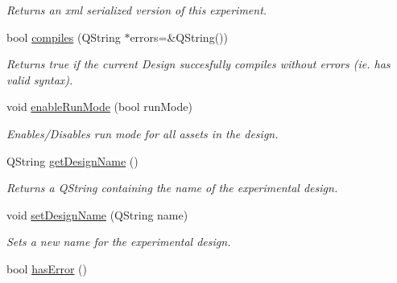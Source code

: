 \begin{DoxyCompactItemize}
\begin{DoxyCompactList}\small\item\em Returns an xml serialized version of this experiment. \end{DoxyCompactList}\item 
bool \hyperlink{class_picto_1_1_design_root_aa0fbfa60b431b196b01616f4107d101c}{compiles} (Q\-String $\ast$errors=\&Q\-String())
\begin{DoxyCompactList}\small\item\em Returns true if the current Design succesfully compiles without errors (ie. has valid syntax). \end{DoxyCompactList}\item 
void \hyperlink{class_picto_1_1_design_root_a602921939c89f471772431dae8c3281a}{enable\-Run\-Mode} (bool run\-Mode)
\begin{DoxyCompactList}\small\item\em Enables/\-Disables run mode for all assets in the design. \end{DoxyCompactList}\item 
\hypertarget{class_picto_1_1_design_root_a9265a1d94d1863fa5c68f02be5b9cb26}{Q\-String \hyperlink{class_picto_1_1_design_root_a9265a1d94d1863fa5c68f02be5b9cb26}{get\-Design\-Name} ()}\label{class_picto_1_1_design_root_a9265a1d94d1863fa5c68f02be5b9cb26}

\begin{DoxyCompactList}\small\item\em Returns a Q\-String containing the name of the experimental design. \end{DoxyCompactList}\item 
\hypertarget{class_picto_1_1_design_root_adfff39e66048dab08b5e4155e2dc6aaa}{void \hyperlink{class_picto_1_1_design_root_adfff39e66048dab08b5e4155e2dc6aaa}{set\-Design\-Name} (Q\-String name)}\label{class_picto_1_1_design_root_adfff39e66048dab08b5e4155e2dc6aaa}

\begin{DoxyCompactList}\small\item\em Sets a new name for the experimental design. \end{DoxyCompactList}\item 
\hypertarget{class_picto_1_1_design_root_af894a34186ddb3f4efd20433a004610b}{bool \hyperlink{class_picto_1_1_design_root_af894a34186ddb3f4efd20433a004610b}{has\-Error} ()}\label{class_picto_1_1_design_root_af894a34186ddb3f4efd20433a004610b}


\end{DoxyCompactItemize}
